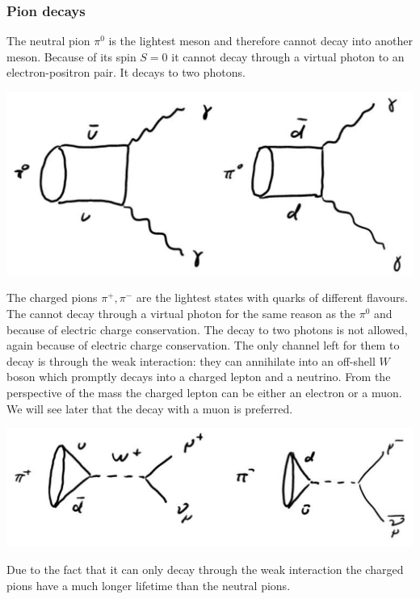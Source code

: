 \documentclass[12pt]{article}
\begin{document}
\subsubsection{Pion decays}
The neutral pion $\pi^0$ is the lightest meson and therefore cannot decay into another meson. Because of its spin $S=0$ it cannot decay through a virtual photon to an electron-positron pair. It decays to two photons.
\begin{center}
\includegraphics[scale=0.3]{images/pi0Decay.png}
\end{center}
The charged pions $\pi^+,\pi^-$ are the lightest states with quarks of different flavours. The cannot decay through a virtual photon for the same reason as the $\pi^0$ and because of electric charge conservation. The decay to two photons is not allowed, again because of electric charge conservation. The only channel left for them to decay is through the weak interaction: they can annihilate into an off-shell $W$ boson which promptly decays into a charged lepton and a neutrino. From the perspective of the mass the charged lepton can be either an electron or a muon. We will see later that the decay with a muon is preferred. 
\begin{center}
\includegraphics[scale=0.3]{images/piDecay.png}
\end{center}
Due to the fact that it can only decay through the weak interaction the charged pions have a much longer lifetime than the neutral pions.
\end{document}
